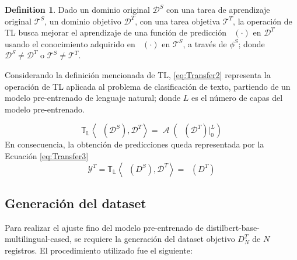 \documentclass[onecolumn, journal, english, 12pt, a4paper]{IEEEtran} %
\newcommand{\modelohuggingface}{distilbert-base-multilingual-cased}
\DeclareMathOperator{\ypredtarget}{\phi^{T}}
\DeclareMathOperator{\ypredsource}{\phi^{S}}
\DeclareMathOperator{\ConvNetOut}{\mathcal{A}}
\theoremstyle{definition}
\newtheorem{definition}{Definition}[section]
\begin{document}

\begin{definition}
    Dado un dominio original $\mathcal{D}^{S}$ con una tarea de aprendizaje original $\mathcal{T}^{S}$, un dominio objetivo $\mathcal{D}^{T}$, con una tarea objetiva $\mathcal{T}^{T}$, la operación de TL busca mejorar el aprendizaje de una función de predicción $\ypredtarget(\cdot)$ en $\mathcal{D}^{T}$ usando el conocimiento adquirido en $\ypredsource(\cdot)$ en $\mathcal{T}^{S}$, a través de $\phi^S$; donde $\mathcal{D}^{S} \neq \mathcal{D}^{T}$ o $\mathcal{T}^{S} \neq \mathcal{T}^{T}$.
\end{definition}

Considerando la definición mencionada de TL, \eqref{eq:Transfer2} representa la operación de TL aplicada al problema de clasificación de texto, partiendo de un modelo pre-entrenado de lenguaje natural; donde $L$ es el número de capas del modelo pre-entrenado.

\begin{equation}
    \mathbb{T_{L}} \left< \ypredsource(\mathcal{D}^{S}), \mathcal{D}^{T}  \right> = \ConvNetOut \left(\ypredsource(\mathcal{D}^{T}) \Bigr\rvert_{0}^{L} \right)
    \label{eq:Transfer2}
\end{equation}
En consecuencia, la obtención de predicciones queda representada por la Ecuación \ref{eq:Transfer3}
\begin{equation}
    \mathcal{Y}^{T} = \mathbb{T_{L}} \left< \ypredsource(D^{S}), \mathcal{D}^{T} \right> = \ypredtarget(D^T) 
    \label{eq:Transfer3}
\end{equation}

\subsection{Generación del dataset}
Para realizar el ajuste fino del modelo pre-entrenado de \modelohuggingface, se requiere la generación del dataset objetivo $D^T_{N}$ de $N$ registros. El procedimiento utilizado fue el siguiente:
\end{document}
